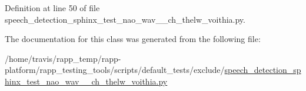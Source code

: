 Definition at line 50 of file speech\-\_\-detection\-\_\-sphinx\-\_\-test\-\_\-nao\-\_\-wav\-\_\-\_\-ch\-\_\-thelw\-\_\-voithia.\-py.



The documentation for this class was generated from the following file\-:\begin{DoxyCompactItemize}
\item 
/home/travis/rapp\-\_\-temp/rapp-\/platform/rapp\-\_\-testing\-\_\-tools/scripts/default\-\_\-tests/exclude/\hyperlink{speech__detection__sphinx__test__nao__wav__1__ch__thelw__voithia_8py}{speech\-\_\-detection\-\_\-sphinx\-\_\-test\-\_\-nao\-\_\-wav\-\_\-\_\-ch\-\_\-thelw\-\_\-voithia.\-py}\end{DoxyCompactItemize}
